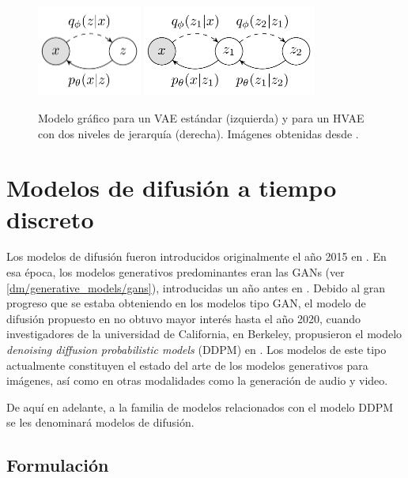 \begin{figure}
    \centering
    \includegraphics[height=3cm]{images/dm/vae_graph}
    \hspace{1cm}
    \includegraphics[height=3cm]{images/dm/hvae_graph}
    \caption{Modelo gráfico para un VAE estándar (izquierda) y para un HVAE con dos niveles de jerarquía (derecha). Imágenes obtenidas desde \cite{turner_diffusion_2021}.}
    \label{fig:dm/vae_hvae_graph}
\end{figure}

\section{Modelos de difusión a tiempo discreto}
\label{dm/discrete_dm}

Los modelos de difusión fueron introducidos originalmente el año 2015 en \cite{sohldickstein2015deep}. En esa época, los modelos generativos predominantes eran las GANs (ver \autoref{dm/generative_models/gans}), introducidas un año antes en \cite{goodfellow2014generative}. Debido al gran progreso que se estaba obteniendo en los modelos tipo GAN, el modelo de difusión propuesto en \cite{sohldickstein2015deep} no obtuvo mayor interés hasta el año 2020, cuando investigadores de la universidad de California, en Berkeley, propusieron el modelo \textit{denoising diffusion probabilistic models} (DDPM) en \cite{ho2020denoising}. Los modelos de este tipo actualmente constituyen el estado del arte de los modelos generativos para imágenes, así como en otras modalidades como la generación de audio y video.

De aquí en adelante, a la familia de modelos relacionados con el modelo DDPM se les denominará modelos de difusión.

\subsection{Formulación}
\label{dm/discrete_dm/formulation}

